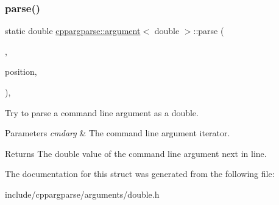 \subsubsection{\texorpdfstring{parse()}{parse()}}
{\footnotesize\ttfamily static double \hyperlink{structcppargparse_1_1argument}{cppargparse\+::argument}$<$ double $>$\+::parse (\begin{DoxyParamCaption}\item[{const types\+::\+Command\+Line\+\_\+t \&}]{,  }\item[{const types\+::\+Command\+Line\+Position\+\_\+t \&}]{position,  }\item[{const types\+::\+Command\+Line\+Arguments\+\_\+t \&}]{ }\end{DoxyParamCaption})\hspace{0.3cm}{\ttfamily [inline]}, {\ttfamily [static]}}



Try to parse a command line argument as a double. 


\begin{DoxyParams}{Parameters}
{\em cmdarg} & The command line argument iterator.\\
\hline
\end{DoxyParams}
\begin{DoxyReturn}{Returns}
The double value of the command line argument next in line. 
\end{DoxyReturn}


The documentation for this struct was generated from the following file\+:\begin{DoxyCompactItemize}
\item 
include/cppargparse/arguments/double.\+h\end{DoxyCompactItemize}
